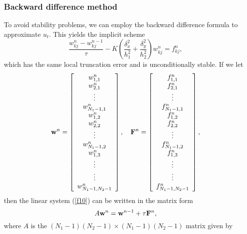 \subsubsection{Backward difference method}
To avoid stability problems, we can employ the backward difference
formula to approximate $u_t$. This yields
the implicit scheme
\begin{equation}
\frac{w_{kj}^{n}-w_{kj}^{n-1}}{\tau} -K\left(
\frac{\delta_{x}^2}{h_{1}^2}+\frac{\delta_{y}^2}{h_{2}^2}\right)w_{kj}^{n}=f_{kj}^n, \label{f10}
\end{equation}
which has the same local truncation error and is unconditionally
stable.
If we let
\begin{equation}
{\bf w}^{n}=\left[
\begin{array}{c}
w_{1,1}^{n} \\
w_{2,1}^{n} \\
\vdots \\
w_{N_{1}-1,1}^{n} \\
w_{1,2}^{n} \\
w_{2,2}^{n} \\
\vdots \\
w_{N_{1}-1,2}^{n} \\
w_{1,3}^{n} \\
\vdots \\
\vdots \\
w_{N_{1}-1,N_{2}-1}^{n}
\end{array}\right],
\quad {\bf F}^{n}=\left[
\begin{array}{c}
f_{1,1}^{n} \\
f_{2,1}^{n} \\
\vdots \\
f_{N_{1}-1,1}^{n} \\
f_{1,2}^{n} \\
f_{2,2}^{n}\\
\vdots \\
f_{N_{1}-1,2}^{n} \\
f_{1,3}^{n} \\
\vdots \\
\vdots \\
f_{N_{1}-1,N_{2}-1}^{n}
\end{array}\right],
\label{eee8}
\end{equation}
then the linear system (\ref{f10}) can be written in the matrix form
\begin{equation}
A{\bf w}^{n}={\bf w}^{n-1}+\tau{\bf F}^{n}, \label{eee9}
\end{equation}
where $A$ is the $(N_{1}-1)(N_{2}-1)\times(N_{1}-1)(N_{2}-1)$ matrix given by

